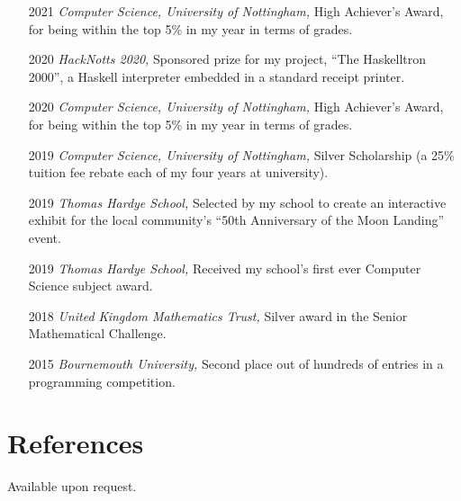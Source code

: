 \documentclass[12pt]{article}
\begin{document}
\begin{itemize}
	\item[2021] \textit{Computer Science, University of Nottingham,} High Achiever's Award, for being within the top 5\% in my year in terms of grades.
	\item[2020] \textit{HackNotts 2020,} Sponsored prize for my project, ``The Haskelltron 2000'', a Haskell interpreter embedded in a standard receipt printer.
	\item[2020] \textit{Computer Science, University of Nottingham,} High Achiever's Award, for being within the top 5\% in my year in terms of grades.
	\item[2019] \textit{Computer Science, University of Nottingham,} Silver Scholarship (a 25\% tuition fee rebate each of my four years at university).
	\item[2019] \textit{Thomas Hardye School,} Selected by my school to create an interactive exhibit for the local community's ``50th Anniversary of the Moon Landing'' event.
	\item[2019] \textit{Thomas Hardye School,} Received my school's first ever Computer Science subject award.
	\item[2018] \textit{United Kingdom Mathematics Trust,} Silver award in the Senior Mathematical Challenge.
	\item[2015] \textit{Bournemouth University,} Second place out of hundreds of entries in a programming competition.
\end{itemize}

\section*{References}
Available upon request.

\vfill
\end{document}
